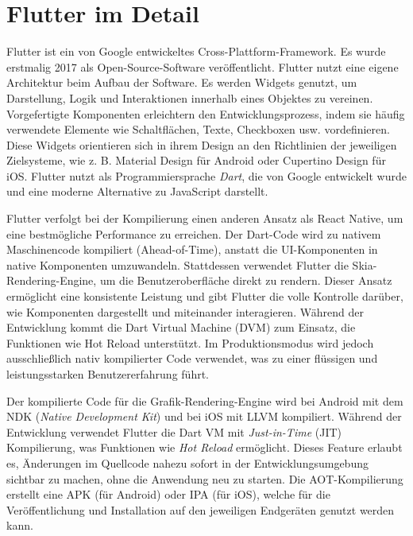 \section{Flutter im Detail}
Flutter ist ein von Google entwickeltes Cross-Plattform-Framework. Es wurde erstmalig 2017 als Open-Source-Software veröffentlicht. Flutter nutzt eine eigene Architektur beim Aufbau der Software. Es werden Widgets genutzt, um Darstellung, Logik und Interaktionen innerhalb eines Objektes zu vereinen. Vorgefertigte Komponenten erleichtern den Entwicklungsprozess, indem sie häufig verwendete Elemente wie Schaltflächen, Texte, Checkboxen usw. vordefinieren. Diese Widgets orientieren sich in ihrem Design an den Richtlinien der jeweiligen Zielsysteme, wie z. B. Material Design für Android oder Cupertino Design für iOS. Flutter nutzt als Programmiersprache \textit{Dart}, die von Google entwickelt wurde und eine moderne Alternative zu JavaScript darstellt.

\vspace{0.5cm}

Flutter verfolgt bei der Kompilierung einen anderen Ansatz als React Native, um eine bestmögliche Performance zu erreichen. Der Dart-Code wird zu nativem Maschinencode kompiliert (Ahead-of-Time), anstatt die UI-Komponenten in native Komponenten umzuwandeln. Stattdessen verwendet Flutter die Skia-Rendering-Engine, um die Benutzeroberfläche direkt zu rendern. Dieser Ansatz ermöglicht eine konsistente Leistung und gibt Flutter die volle Kontrolle darüber, wie Komponenten dargestellt und miteinander interagieren. Während der Entwicklung kommt die Dart Virtual Machine (DVM) zum Einsatz, die Funktionen wie Hot Reload unterstützt. Im Produktionsmodus wird jedoch ausschließlich nativ kompilierter Code verwendet, was zu einer flüssigen und leistungsstarken Benutzererfahrung führt.

\vspace{0.5cm}

Der kompilierte Code für die Grafik-Rendering-Engine wird bei Android mit dem NDK (\textit{Native Development Kit}) und bei iOS mit LLVM kompiliert. Während der Entwicklung verwendet Flutter die Dart VM mit \textit{Just-in-Time} (JIT) Kompilierung, was Funktionen wie \textit{Hot Reload} ermöglicht. Dieses Feature erlaubt es, Änderungen im Quellcode nahezu sofort in der Entwicklungsumgebung sichtbar zu machen, ohne die Anwendung neu zu starten. Die AOT-Kompilierung erstellt eine APK (für Android) oder IPA (für iOS), welche für die Veröffentlichung und Installation auf den jeweiligen Endgeräten genutzt werden kann.

